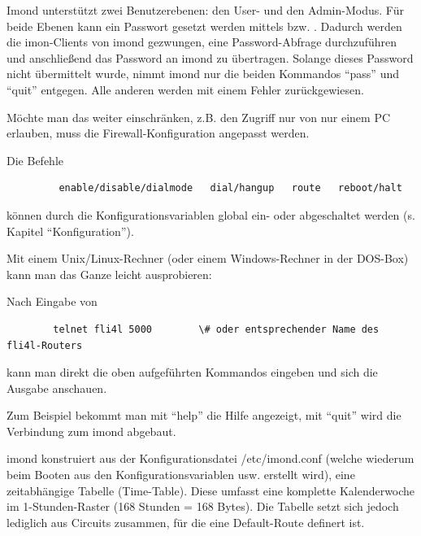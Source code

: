   Imond unterstützt zwei Benutzerebenen: den User- und den
  Admin-Modus.  Für beide Ebenen kann ein Passwort gesetzt werden
  mittels  bzw.  . Dadurch
  werden die imon-Clients von imond gezwungen, eine Password-Abfrage
  durchzuführen und anschließend das Password an imond zu übertragen.
  Solange dieses Password nicht übermittelt wurde, nimmt imond nur die
  beiden Kommandos ``pass'' und ``quit'' entgegen. Alle anderen werden
  mit einem Fehler zurückgewiesen.

  Möchte man das weiter einschränken, z.B. den Zugriff nur von nur
  einem PC erlauben, muss die Firewall-Konfiguration angepasst werden.

  Die Befehle

\begin{example}
\begin{verbatim}
         enable/disable/dialmode   dial/hangup   route   reboot/halt
\end{verbatim}
\end{example}

  können durch die Konfigurationsvariablen  global ein- oder
  abgeschaltet werden (s. Kapitel ``Konfiguration'').

  Mit einem Unix/Linux-Rechner (oder einem Windows-Rechner in der DOS-Box)
  kann man das Ganze leicht ausprobieren:

  Nach Eingabe von

\begin{example}
\begin{verbatim}
        telnet fli4l 5000        \# oder entsprechender Name des fli4l-Routers
\end{verbatim}
\end{example}

  kann man direkt die oben aufgeführten Kommandos eingeben und sich
  die Ausgabe anschauen.

  Zum Beispiel bekommt man mit ``help'' die Hilfe angezeigt, mit
  ``quit'' wird die Verbindung zum imond abgebaut.


  imond konstruiert aus der Konfigurationsdatei /etc/imond.conf
  (welche wiederum beim Booten aus den Konfigurationsvariablen
   usw.  erstellt wird), eine zeitabhängige
  Tabelle (Time-Table). Diese umfasst eine komplette Kalenderwoche im
  1-Stunden-Raster (168 Stunden = 168 Bytes). Die Tabelle setzt sich
  jedoch lediglich aus Circuits zusammen, für die eine Default-Route
  definert ist.

